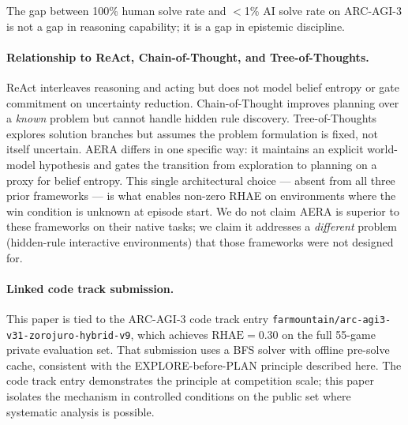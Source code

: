 \documentclass[11pt]{article}
\begin{document}
The gap between 100\% human solve rate and $<$1\% AI solve rate on ARC-AGI-3 is not a gap in reasoning capability; it is a gap in epistemic discipline.

\begin{center}
\end{center}

\paragraph{Relationship to ReAct, Chain-of-Thought, and Tree-of-Thoughts.} ReAct \cite{yao2023react} interleaves reasoning and acting but does not model belief entropy or gate commitment on uncertainty reduction. Chain-of-Thought \cite{wei2022chain} improves planning over a \emph{known} problem but cannot handle hidden rule discovery. Tree-of-Thoughts \cite{yao2023tree} explores solution branches but assumes the problem formulation is fixed, not itself uncertain. AERA differs in one specific way: it maintains an explicit world-model hypothesis and gates the transition from exploration to planning on a proxy for belief entropy. This single architectural choice --- absent from all three prior frameworks --- is what enables non-zero RHAE on environments where the win condition is unknown at episode start. We do not claim AERA is superior to these frameworks on their native tasks; we claim it addresses a \emph{different} problem (hidden-rule interactive environments) that those frameworks were not designed for.

\paragraph{Linked code track submission.} This paper is tied to the ARC-AGI-3 code track entry \texttt{farmountain/arc-agi3-v31-zorojuro-hybrid-v9}, which achieves $\text{RHAE}=0.30$ on the full 55-game private evaluation set. That submission uses a BFS solver with offline pre-solve cache, consistent with the EXPLORE-before-PLAN principle described here. The code track entry demonstrates the principle at competition scale; this paper isolates the mechanism in controlled conditions on the public set where systematic analysis is possible.
\end{document}
